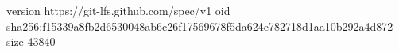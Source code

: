 version https://git-lfs.github.com/spec/v1
oid sha256:f15339a8fb2d6530048ab6c26f17569678f5da624c782718d1aa10b292a4d872
size 43840
